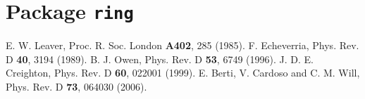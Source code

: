 \chapter{Package \texttt{ring}}

\newpage

\newpage\begin{thebibliography}{0}
  E. W. Leaver, Proc. R. Soc. London \textbf{A402}, 285 (1985).
  F. Echeverria, Phys. Rev. D \textbf{40}, 3194 (1989).
  B. J. Owen, Phys. Rev. D \textbf{53}, 6749 (1996).
  J. D. E. Creighton, Phys. Rev. D \textbf{60}, 022001 (1999).
  E. Berti, V. Cardoso and C. M. Will, Phys. Rev. D \textbf{73}, 064030 (2006).
\end{thebibliography}


